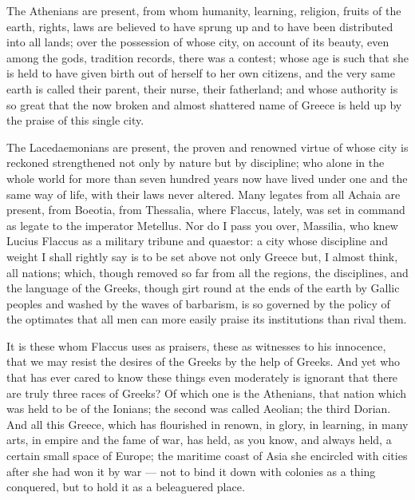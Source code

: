  The Athenians are present, from whom humanity, learning, religion, fruits of the earth, rights, laws are believed to have sprung up and to have been distributed into all lands; over the possession of whose city, on account of its beauty, even among the gods, tradition records, there was a contest; whose age is such that she is held to have given birth out of herself to her own citizens, and the very same earth is called their parent, their nurse, their fatherland; and whose authority is so great that the now broken and almost shattered name of Greece is held up by the praise of this single city.

 The Lacedaemonians are present, the proven and renowned virtue of whose city is reckoned strengthened not only by nature but by discipline; who alone in the whole world for more than seven hundred years now have lived under one and the same way of life, with their laws never altered. Many legates from all Achaia are present, from Boeotia, from Thessalia, where Flaccus, lately, was set in command as legate to the imperator Metellus. Nor do I pass you over, Massilia, who knew Lucius Flaccus as a military tribune and quaestor: a city whose discipline and weight I shall rightly say is to be set above not only Greece but, I almost think, all nations; which, though removed so far from all the regions, the disciplines, and the language of the Greeks, though girt round at the ends of the earth by Gallic peoples and washed by the waves of barbarism, is so governed by the policy of the optimates that all men can more easily praise its institutions than rival them.

 It is these whom Flaccus uses as praisers, these as witnesses to his innocence, that we may resist the desires of the Greeks by the help of Greeks. And yet who that has ever cared to know these things even moderately is ignorant that there are truly three races of Greeks? Of which one is the Athenians, that nation which was held to be of the Ionians; the second was called Aeolian; the third Dorian. And all this Greece, which has flourished in renown, in glory, in learning, in many arts, in empire and the fame of war, has held, as you know, and always held, a certain small space of Europe; the maritime coast of Asia she encircled with cities after she had won it by war --- not to bind it down with colonies as a thing conquered, but to hold it as a beleaguered place.

